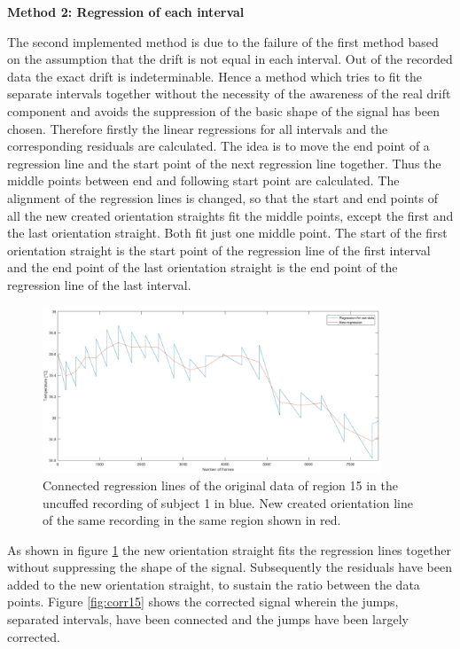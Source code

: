 \textbf{Method 2: Regression of each interval}

The second implemented method is due to the failure of the first method based on the assumption that the drift is not equal in each interval. Out of the recorded data the exact drift is indeterminable. Hence a method which tries to fit the separate intervals together without the necessity of the awareness of the real drift component and avoids the suppression of the basic shape of the signal has been chosen.
Therefore firstly the linear regressions for all intervals and the corresponding residuals are calculated.
The idea is to move the end point of a regression line and the start point of the next regression line together. Thus the middle points between end and following start point are calculated. The alignment of the regression lines is changed, so that the start and end points of all the new created orientation straights fit the middle points, except the first and the last orientation straight. Both fit just one middle point. The start of the first orientation straight is the start point of the regression line of the first interval and the end point of the last orientation straight is the end point of the regression line of the last interval.
\begin{figure}[H]
	\includegraphics[width=0.9\textwidth]{figures/reg15}
	\caption{Connected regression lines of the original data of region 15 in the uncuffed recording of subject 1 in blue. New created orientation line of the same recording in the same region shown in red.}
	\label{fig:reg15}
\end{figure}
As shown in figure \ref{fig:reg15} the new orientation straight fits the regression lines together without suppressing the shape of the signal. Subsequently the residuals have been added to the new orientation straight, to sustain the ratio between the data points. Figure \ref{fig:corr15} shows the corrected signal wherein the jumps, separated intervals, have been connected and the jumps have been largely corrected.
